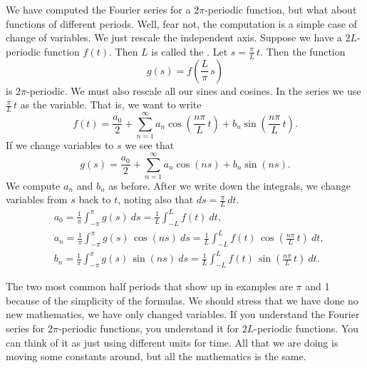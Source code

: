 \documentclass[12pt]{book}
\begin{document}
We have computed the Fourier series for a $2\pi$-periodic function, but what
about functions of different periods.  Well, fear not, the computation is a
simple case of change of variables.  We just rescale the independent
axis.  Suppose we have a $2L$-periodic function $f(t)$.  Then $L$ is called
the \emph{}.  Let $s = \frac{\pi}{L} \, t$.
Then the function
\begin{equation*}
g(s) = f\left(\frac{L}{\pi}\,s \right)
\end{equation*}
is $2\pi$-periodic.  We must also rescale all our sines and cosines.
In the series we use $\frac{\pi}{L}\,t$ as the variable.  That is, we
want to write
\begin{equation*}
\boxed{~~
f(t) = 
\frac{a_0}{2} +
\sum_{n=1}^\infty a_n \cos \left( \frac{n \pi}{L}\, t \right)
+ b_n \sin \left(\frac{n \pi}{L} \, t \right) .
~~}
\end{equation*}
If we change variables to $s$ we see that
\begin{equation*}
g(s) = 
\frac{a_0}{2} +
\sum_{n=1}^\infty a_n \cos (n s)
+ b_n \sin (n s) .
\end{equation*}
We compute $a_n$ and $b_n$ as before.  After we write down the
integrals, we change variables from $s$ back to $t$, noting also
that $ds = \frac{\pi}{L} \, dt$.
\begin{equation*}
\boxed{~~
\begin{aligned}
& a_0 =
\frac{1}{\pi}
\int_{-\pi}^\pi
g(s) ~ ds
=
\frac{1}{L}
\int_{-L}^L
f(t) ~ dt , \\
& a_n =
\frac{1}{\pi}
\int_{-\pi}^\pi
g(s) \, \cos (n s) ~ ds
=
\frac{1}{L}
\int_{-L}^L
f(t) \, \cos \left( \frac{n \pi}{L}\, t \right) ~ dt , \\
& b_n =
\frac{1}{\pi}
\int_{-\pi}^\pi
g(s) \, \sin (n s) ~ ds
=
\frac{1}{L}
\int_{-L}^L
f(t) \, \sin \left( \frac{n \pi}{L}\, t \right) ~ dt .
\end{aligned}
~~}
\end{equation*}

The two most common half periods that show up in examples
are $\pi$ and 1 because of the simplicity of the formulas.  We should stress that we have
done no new mathematics, we have only changed variables.  If you understand 
the Fourier series for $2\pi$-periodic functions, you understand it for
$2L$-periodic functions.  You can think of it as just using
different units for time.  All that we are doing is moving some constants
around, but all the mathematics is the same.
\end{document}
